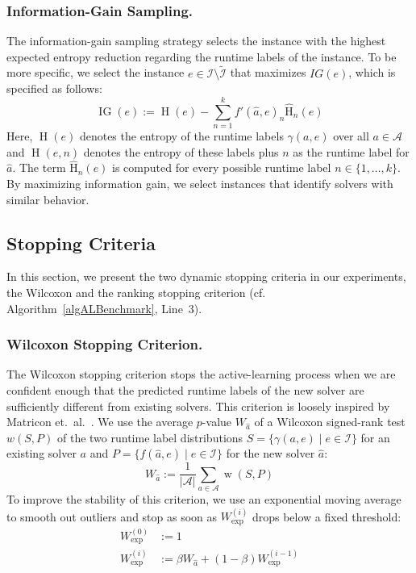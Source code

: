 \documentclass[runningheads]{llncs}
\begin{document}
\subsubsection{Information-Gain Sampling.}

The information-gain sampling strategy selects the instance with the highest expected entropy reduction regarding the runtime labels of the instance.
To be more specific, we select the instance $e \in \mathcal{I} \setminus \tilde{\mathcal{I}}$ that maximizes $IG(e)$, which is specified as follows:
%
\begin{equation*}
  \operatorname{IG}(e) := \operatorname{H}(e) - \sum_{n = 1}^{k} f'(\hat{a}, e)_{n} \operatorname{\hat H}_n(e)
\end{equation*}
%
Here, $\operatorname{H}(e)$ denotes the entropy of the runtime labels $\gamma(a, e)$ over all $a \in \mathcal{A}$ and $\operatorname{H}(e, n)$ denotes the entropy of these labels plus $n$ as the runtime label for $\hat{a}$.
The term $\operatorname{\hat H}_n(e)$ is computed for every possible runtime label $n \in \{1, \dots, k\}$.
By maximizing information gain, we select instances that identify solvers with similar behavior.

\subsection{Stopping Criteria}
\label{sec:main:stopping}

In this section, we present the two dynamic stopping criteria in our experiments, the Wilcoxon and the ranking stopping criterion (cf. Algorithm~\ref{algALBenchmark}, Line~3).

\subsubsection{Wilcoxon Stopping Criterion.}

The Wilcoxon stopping criterion stops the active-learning process when we are confident enough that the predicted runtime labels of the new solver are sufficiently different from existing solvers.
This criterion is loosely inspired by Matricon et.~al.~\cite{MatriconAFSH21}.
We use the average $p$-value $W_{\hat{a}}$ of a Wilcoxon signed-rank test $w(S,P)$ of the two runtime label distributions $S=\{ \gamma(a, e) \mid e \in \mathcal{I} \}$ for an existing solver $a$ and \mbox{$P=\{ f(\hat a, e) \mid e \in \mathcal{I} \}$} for the new solver $\hat{a}$:
%
\begin{equation*}
  W_{\hat{a}} := \frac{1}{\lvert \mathcal{A} \rvert} \sum_{a \in \mathcal{A}} \operatorname{w}(S, P)
\end{equation*}
%
To improve the stability of this criterion, we use an exponential moving average to smooth out outliers and stop as soon as $W^{(i)}_{\exp}$ drops below a fixed threshold:
%
\begin{align*}
  W_{\exp}^{\left(0\right)} &:= 1\\
  W_{\exp}^{\left(i\right)} &:= \beta W_{\hat{a}} + \left(1 - \beta\right) W_{\exp}^{\left(i - 1\right)}
\end{align*}
\end{document}
